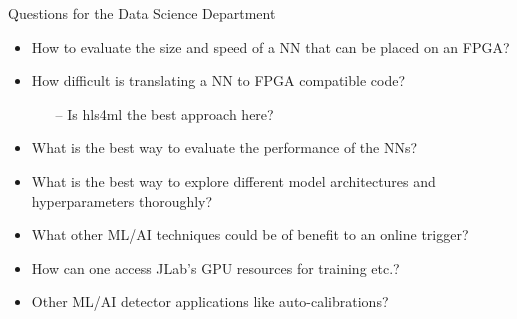 \documentclass[10pt]{beamer}
\begin{document}
\begin{frame}{Questions for the Data Science Department}

	\begin{itemize}
		\item How to evaluate the size and speed of a NN that can be placed on an FPGA?
		\item How difficult is translating a NN to FPGA compatible code?
			\begin{itemize}
				\item[--] Is hls4ml the best approach here?
			\end{itemize}
		\item What is the best way to evaluate the performance of the NNs?
		\item What is the best way to explore different model architectures and hyperparameters thoroughly?
		\item What other ML/AI techniques could be of benefit to an online trigger?
		\item How can one access JLab's GPU resources for training etc.?
		\item Other ML/AI detector applications like auto-calibrations?
	\end{itemize}

\end{frame}
\end{document}
